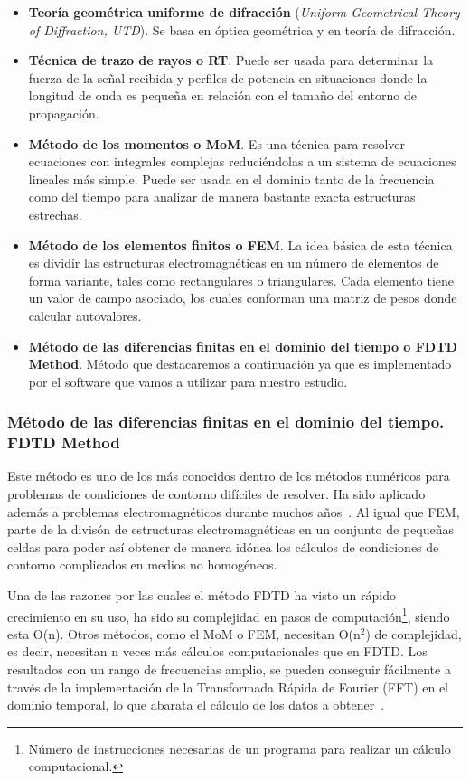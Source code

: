 \begin{itemize}
    \item  \textbf{Teoría geométrica uniforme de difracción} (\textit{Uniform Geometrical Theory of Diffraction, UTD}). Se basa en óptica geométrica y en teoría de difracción.
    \item  \textbf{Técnica de trazo de rayos o RT}. Puede ser usada para determinar la fuerza de la señal recibida y perfiles de potencia en situaciones donde la longitud de onda es pequeña en relación con el tamaño del entorno de propagación.
    \item \textbf{Método de los momentos o MoM}. Es una técnica para resolver ecuaciones con integrales complejas reduciéndolas a un sistema de ecuaciones lineales más simple. Puede ser usada en el dominio tanto de la frecuencia como del tiempo para analizar de manera bastante exacta estructuras estrechas.
    \item \textbf{Método de los elementos finitos o FEM}. La idea básica de esta técnica es dividir las estructuras electromagnéticas en un número de elementos de forma variante, tales como rectangulares o triangulares. Cada elemento tiene un valor de campo asociado, los cuales conforman una matriz de pesos donde calcular autovalores.
    \item \textbf{Método de las diferencias finitas en el dominio del tiempo o FDTD Method}. Método que destacaremos a continuación ya que es implementado por el software que vamos a utilizar para nuestro estudio.
\end{itemize}

\subsubsection{Método de las diferencias finitas en el dominio del tiempo. FDTD Method}

Este método es uno de los más conocidos dentro de los métodos numéricos para problemas de condiciones de contorno difíciles de resolver. Ha sido aplicado además a problemas electromagnéticos durante muchos años~\cite{yang}. Al igual que FEM, parte de la divisón de estructuras electromagnéticas en un conjunto de pequeñas celdas para poder así obtener de manera idónea los cálculos de condiciones de contorno complicados en medios no homogéneos.

Una de las razones por las cuales el método FDTD ha visto un rápido crecimiento en su uso, ha sido su complejidad en pasos de computación\footnote{Número de instrucciones necesarias de un programa para realizar un cálculo computacional.}, siendo esta O(n). Otros métodos, como el MoM o FEM, necesitan O(n$^{2}$) de complejidad, es decir, necesitan n veces más cálculos computacionales que en FDTD. Los resultados con un rango de frecuencias amplio, se pueden conseguir fácilmente a través de la implementación de la Transformada Rápida de Fourier (FFT) en el dominio temporal, lo que abarata el cálculo de los datos a obtener~\cite{yang}.

